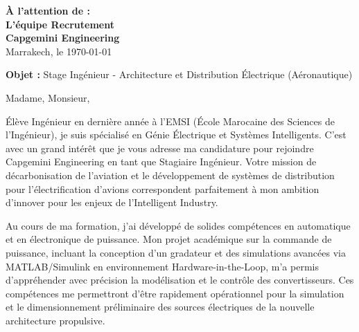 \documentclass[10pt,a4paper]{../../altacv}
\makeatletter
\renewcommand{\makecvheader}{%
  \begingroup
    \raggedright\color{emphasis}%
    {\Huge\bfseries\MakeUppercase{\@name}\par}
    \medskip
    {\large\bfseries\color{accent}\@tagline\par}
    \medskip
    {\footnotesize\bfseries\@personalinfo\par}
  \endgroup\medskip
}
\makeatother
\begin{document}

\makecvheader

\bigskip
\medskip

\begin{flushright}
  {\color{emphasis}\textbf{À l'attention de :}} \\[2pt]
  \textbf{L'équipe Recrutement} \\
  \textbf{Capgemini Engineering} \\[20pt]
  Marrakech, le \today
\end{flushright}
\bigskip

\bigskip

{\color{accent}\textbf{Objet :}} Stage Ingénieur - Architecture et Distribution Électrique (Aéronautique)

\bigskip\bigskip

Madame, Monsieur,

\vspace{0.4cm}

Élève Ingénieur en dernière année à l'EMSI (École Marocaine des Sciences de l'Ingénieur), je suis spécialisé en Génie Électrique et Systèmes Intelligents. C'est avec un grand intérêt que je vous adresse ma candidature pour rejoindre Capgemini Engineering en tant que Stagiaire Ingénieur. Votre mission de décarbonisation de l'aviation et le développement de systèmes de distribution pour l'électrification d'avions correspondent parfaitement à mon ambition d'innover pour les enjeux de l'Intelligent Industry.

\vspace{0.4cm}

Au cours de ma formation, j'ai développé de solides compétences en automatique et en électronique de puissance. Mon projet académique sur la commande de puissance, incluant la conception d'un gradateur et des simulations avancées via MATLAB/Simulink en environnement Hardware-in-the-Loop, m'a permis d'appréhender avec précision la modélisation et le contrôle des convertisseurs. Ces compétences me permettront d'être rapidement opérationnel pour la simulation et le dimensionnement préliminaire des sources électriques de la nouvelle architecture propulsive.
\end{document}
